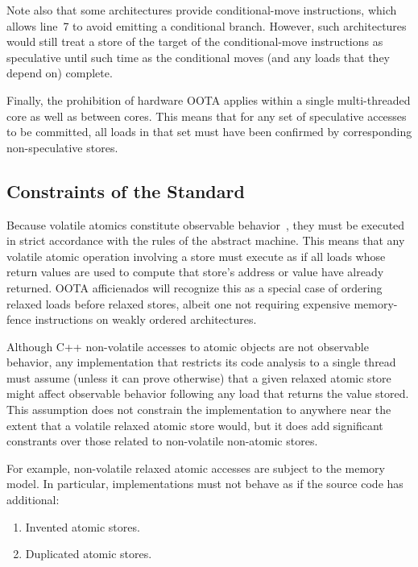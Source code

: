 \documentclass[10]{article}
\begin{document}
Note also that some architectures provide conditional-move instructions,
which allows line~7 to avoid emitting a conditional branch.
However, such architectures would still treat a store of the
target of the conditional-move instructions as speculative until
such time as the conditional moves (and any loads that they depend
on) complete.

Finally, the prohibition of hardware OOTA applies within a single
multi-threaded core as well as between cores.
This means that for any set of speculative accesses to be committed,
all loads in that set must have been confirmed by corresponding
non-speculative stores.

\subsection{Constraints of the Standard}
\label{sec:Constraints of the Standard}

Because volatile atomics constitute observable
behavior~\cite[]{ThomasKoeppe2023N4950},
they must be executed in strict accordance with the rules of the abstract
machine.
This means that any volatile atomic operation involving a store
must execute as if all loads whose return values are used to compute
that store's address or value have already returned.
OOTA afficienados will recognize this as a special case of ordering
relaxed loads before relaxed stores, albeit one not requiring
expensive memory-fence instructions on weakly ordered architectures.

Although C++ non-volatile accesses to atomic objects are not observable
behavior, any implementation that restricts its code analysis to a
single thread must assume (unless it can prove otherwise) that a given
relaxed atomic store might affect observable behavior following any
load that returns the value stored.
This assumption does not constrain the implementation to anywhere near
the extent that a volatile relaxed atomic store would, but it does add
significant constrants over those related to non-volatile non-atomic
stores.

For example, non-volatile relaxed atomic accesses are subject to the
memory model.
In particular, implementations must not behave as if the source code has
additional:

\begin{enumerate}
\item	Invented atomic stores.
\item	Duplicated atomic stores.
\end{enumerate}
\end{document}
